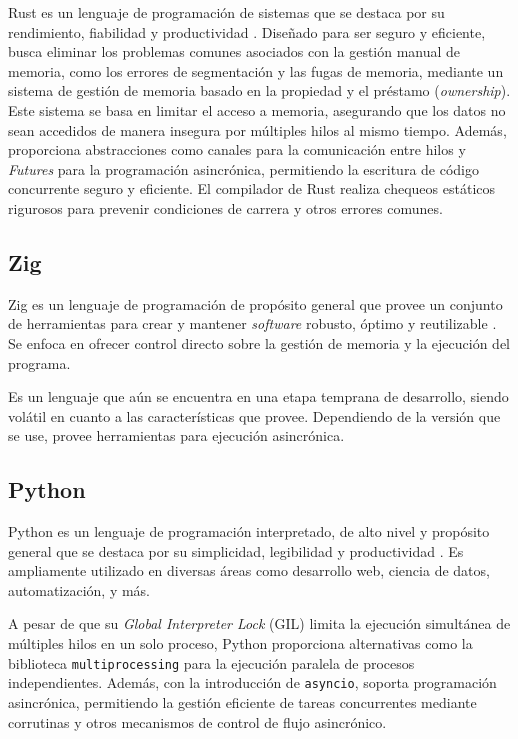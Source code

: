 \documentclass[11pt]{article}
\let\Oldsubsection\subsection
\renewcommand{\subsection}{\FloatBarrier\Oldsubsection}
\newcommand{\english}[1]{\textit{#1}}
\begin{document}
Rust es un lenguaje de programación de sistemas que se destaca por su rendimiento, fiabilidad y productividad \cite{com:rust}. Diseñado para ser seguro y eficiente, busca eliminar los problemas comunes asociados con la gestión manual de memoria, como los errores de segmentación y las fugas de memoria, mediante un sistema de gestión de memoria basado en la propiedad y el préstamo (\english{ownership}).
Este sistema se basa en limitar el acceso a memoria, asegurando que los datos no sean accedidos de manera insegura por múltiples hilos al mismo tiempo. Además, proporciona abstracciones como canales para la comunicación entre hilos y \english{Futures} para la programación asincrónica, permitiendo la escritura de código concurrente seguro y eficiente. El compilador de Rust realiza chequeos estáticos rigurosos para prevenir condiciones de carrera y otros errores comunes.

\subsection{Zig}

Zig es un lenguaje de programación de propósito general que provee un conjunto de herramientas para crear y mantener \english{software} robusto, óptimo y reutilizable \cite{com:zig}. Se enfoca en ofrecer control directo sobre la gestión de memoria y la ejecución del programa.

Es un lenguaje que aún se encuentra en una etapa temprana de desarrollo, siendo volátil en cuanto a las características que provee. Dependiendo de la versión que se use, provee herramientas para ejecución asincrónica.

\subsection{Python}

Python es un lenguaje de programación interpretado, de alto nivel y propósito general que se destaca por su simplicidad, legibilidad y productividad \cite{com:python}. Es ampliamente utilizado en diversas áreas como desarrollo web, ciencia de datos, automatización, y más.

A pesar de que su \english{Global Interpreter Lock} (GIL) limita la ejecución simultánea de múltiples hilos en un solo proceso, Python proporciona alternativas como la biblioteca \lstinline{multiprocessing} para la ejecución paralela de procesos independientes. Además, con la introducción de \lstinline{asyncio}, soporta programación asincrónica, permitiendo la gestión eficiente de tareas concurrentes mediante corrutinas y otros mecanismos de control de flujo asincrónico.
\end{document}
